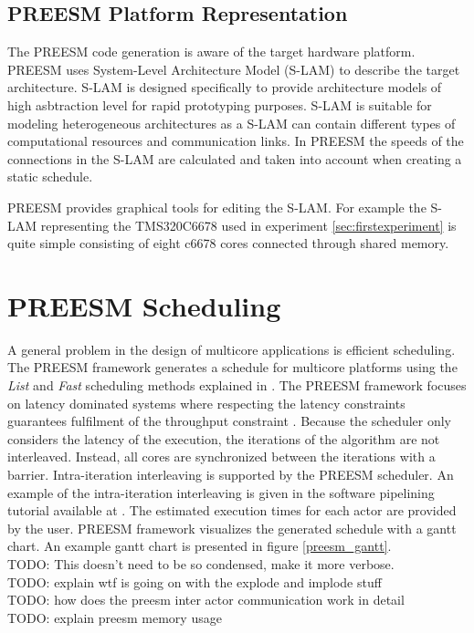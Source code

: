 \subsection{PREESM Platform Representation}
The PREESM code generation is aware of the target hardware platform. PREESM
uses System-Level Architecture Model (S-LAM) \cite{pelcat2009system} to
describe the target architecture. S-LAM is designed specifically to provide
architecture models of high asbtraction level for rapid prototyping purposes.
S-LAM is suitable for modeling heterogeneous architectures as a S-LAM can
contain different types of computational resources and communication links. In
PREESM the speeds of the connections in the S-LAM are calculated and taken into
account when creating a static schedule. \cite{pelcat2009system}

PREESM provides graphical tools for editing the S-LAM. For example the S-LAM
representing the TMS320C6678 used in experiment \ref{sec:firstexperiment} is
quite simple consisting of eight c6678 cores connected through shared memory.

\section{PREESM Scheduling}
\label{sec:preesmsched}
A general problem in the design of multicore applications is efficient
scheduling. The PREESM framework generates a schedule for multicore platforms
using the \textit{List} and \textit{Fast} scheduling methods explained in
\cite{kwok1997high}. The PREESM framework focuses on latency dominated systems
where respecting the latency constraints guarantees fulfilment of the throughput
constraint \cite{pelcat2014preesm, ghamarian2006throughput}. Because the
scheduler only considers the latency of the execution, the iterations of the
algorithm are not interleaved. Instead, all cores are synchronized between the
iterations with a barrier. Intra-iteration interleaving is supported by the
PREESM scheduler. \cite{pelcat2014preesm} An example of the intra-iteration
interleaving is given in the software pipelining tutorial available at
\cite{preesm}. The estimated execution times for each actor are provided by the
user. PREESM framework visualizes the generated schedule with a gantt chart. An
example gantt chart is presented in figure \ref{preesm_gantt}.\\
TODO: This doesn't need to be so condensed, make it more verbose.\\
TODO: explain wtf is going on with the explode and implode stuff \\
TODO: how does the preesm inter actor communication work in detail \\
TODO: explain preesm memory usage

